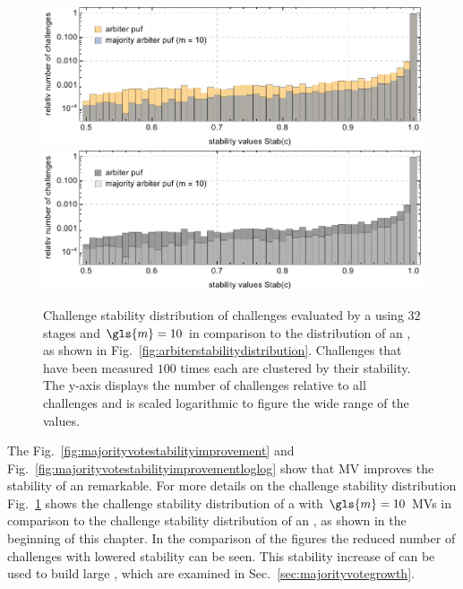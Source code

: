 \begin{figure}[!htp] %
\ifx{}\undefined
{}
\else
	\if{}
\centering
\includegraphics[width=1.00\textwidth]{images/comparison-arbiter-stability-distribution-majority-arbiter-stability-distribution.pdf}
	\else
\includegraphics[width=1.00\textwidth]{images/comparison-arbiter-stability-distribution-majority-arbiter-stability-distribution_mono.pdf}
    \fi
\fi
\caption[Challenge stability distribution of a \mpuf]{Challenge stability distribution of challenges evaluated by a \mpuf using $32$ stages and $\gls{m} = 10$ in comparison to the distribution of an \apuf, as shown in Fig.\ \ref{fig:arbiterstabilitydistribution}. Challenges that have been measured $100$ times each are clustered by their stability. The y-axis displays the number of challenges relative to all challenges and is scaled logarithmic to figure the wide range of the values.} 
\label{fig:comparisonarbiterstabilitydistributionmajorityarbiterstabilitydistribution}
\end{figure}

The Fig.\ \ref{fig:majorityvotestabilityimprovement} and Fig.\ \ref{fig:majorityvotestabilityimprovementloglog} show that \ac{MV} improves the stability of an \apuf remarkable. 
For more details on the challenge stability distribution Fig.\ \ref{fig:comparisonarbiterstabilitydistributionmajorityarbiterstabilitydistribution} shows the challenge stability distribution of a \mpuf with $\gls{m} = 10$ \acp{MV} in comparison to the challenge stability distribution of an \apuf, as shown in the beginning of this chapter.
In the comparison of the figures the reduced number of challenges with lowered stability can be seen.
This stability increase of \mpufs can be used to build large \mxpufs, which are examined in Sec.\ \ref{sec:majorityvotegrowth}.

